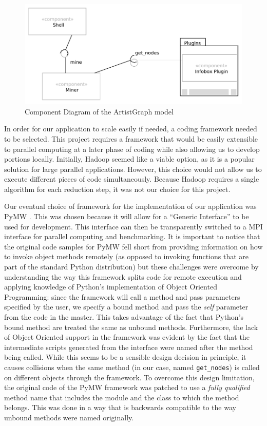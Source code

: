 \documentclass{sig-alternate}
\begin{document}
\begin{figure}[ht!]
\centering
\includegraphics[width=12cm]{ArtistGraph_Architecture.PDF}
\caption{Component Diagram of the ArtistGraph model}
\label{componentdiagram}
\end{figure}

In order for our application to scale easily if needed, a coding framework needed to be selected. This project 
requires a framework that would be easily extensible to parallel computing at a later phase of 
coding while also allowing us to develop portions locally. Initially, Hadoop seemed like 
a viable option, as it is a popular solution for large parallel applications. However, 
this choice would not allow us to execute different pieces of code simultaneously. Because 
Hadoop requires a single algorithm for each reduction step, it was not our choice for this project. 

Our eventual choice of framework for the implementation of our application was PyMW \cite {ieee5161132}. 
This was chosen because it will allow for a ``Generic Interface'' to be used for development. 
This interface can then be transparently switched to a MPI interface for parallel computing and 
benchmarking. It is important to notice that the original code samples for PyMW fell short from
providing information on how to invoke object methods remotely (as opposed to invoking functions
that are part of the standard Python distribution) but these challenges were overcome by
understanding the way this framework splits code for remote execution and applying knowledge
of Python's implementation of Object Oriented Programming: since the framework will call a method and pass parameters
specified by the user, we specify a bound method and pass the \emph{self} parameter from the code in the master. This
takes advantage of the fact that Python's bound method are treated the same as unbound methods. Furthermore, the lack of
Object Oriented support in the framework was evident by the fact that the intermediate scripts generated from the
interface were named after the method being called. While this seems to be a sensible design decision in principle, it
causes collisions when the same method (in our case, named {\tt get\_nodes}) is called on different objects through the
framework. To overcome this design limitation, the original code of the PyMW framework was patched to use a \emph{fully
  qualified} method name that  includes the module and the class to which the method belongs. This was done in a way
that is backwards compatible to the way unbound methods were named originally.
\end{document}

